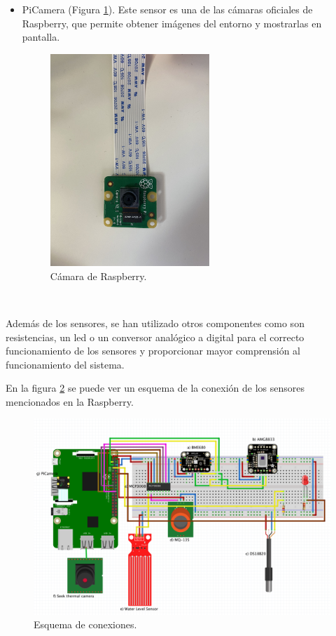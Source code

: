 \begin{itemize}
\item{PiCamera (Figura \ref{fig:picam}).} Este sensor es una de las cámaras oficiales de Raspberry, que permite obtener imágenes del entorno y mostrarlas en pantalla.
\begin{figure} [h!]
  \begin{center}
    \includegraphics[width=6cm]{figs/picam}
  \end{center}
  \caption{Cámara de Raspberry.}
  \label{fig:picam}
\end{figure}\\
\end{itemize}

Además de los sensores, se han utilizado otros componentes como son resistencias, un led o un conversor analógico a digital para el correcto funcionamiento de los sensores y proporcionar mayor comprensión al funcionamiento del sistema.

En la figura \ref{fig:esquema} se puede ver un esquema de la conexión de los sensores mencionados en la Raspberry.
\begin{figure} [h!]
  \begin{center}
    \includegraphics[width=14cm]{figs/esquema}
  \end{center}
  \caption{Esquema de conexiones.}
  \label{fig:esquema}
\end{figure}\\

